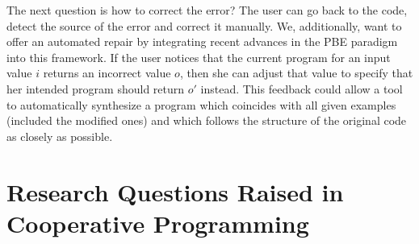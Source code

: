 The next question is how to correct the error? The user can go back to the code, detect
the source of the error and correct it manually. We, additionally, want to offer an 
automated repair by integrating recent advances in the PBE paradigm into this framework.
If the user notices that the current program for an input value $i$ returns an incorrect value $o$, then she can adjust that value to specify that her intended program should return $o'$ instead. This feedback could allow a tool to automatically synthesize a program which coincides with all given examples (included the modified ones) and which follows the structure of the original code as closely as possible.


\section{Research Questions Raised in Cooperative Programming }

